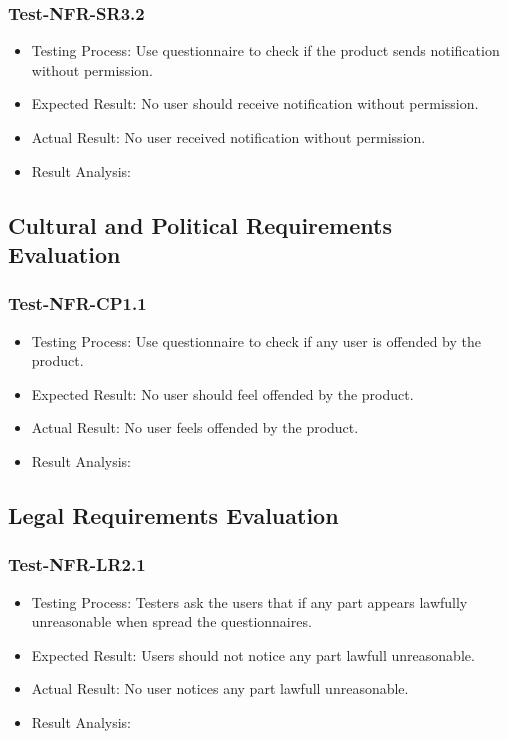 \documentclass[12pt, titlepage]{article}
\begin{document}
\subsubsection{Test-NFR-SR3.2}
\begin{itemize}
    \item Testing Process: Use questionnaire to check if the product sends notification without permission.
    \item Expected Result: No user should receive notification without permission.
    \item Actual Result: No user received notification without permission.
    \item Result Analysis: \pass
\end{itemize}


\subsection{Cultural and Political Requirements Evaluation}
\subsubsection{Test-NFR-CP1.1}
\begin{itemize}
    \item Testing Process: Use questionnaire to check if any user is offended by the product.
    \item Expected Result: No user should feel offended by the product.
    \item Actual Result: No user feels offended by the product.
    \item Result Analysis: \pass
\end{itemize}

\subsection{Legal Requirements Evaluation}
\subsubsection{Test-NFR-LR2.1}
\begin{itemize}
    \item Testing Process: Testers ask the users that if any part appears lawfully unreasonable when spread the questionnaires.
    \item Expected Result: Users should not notice any part lawfull unreasonable.
    \item Actual Result: No user notices any part lawfull unreasonable.
    \item Result Analysis: \pass
\end{itemize}
\end{document}
